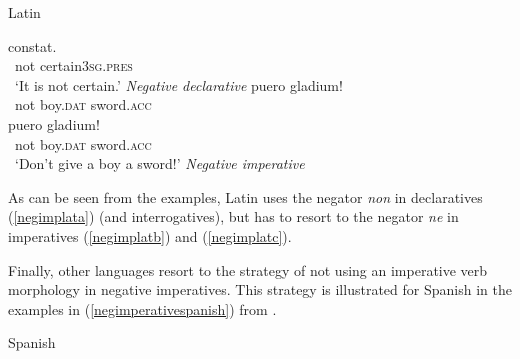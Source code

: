 \begin{exe}
\ex Latin\label{negimplat}
\begin{xlist} 
\ex {} {constat.}\\
{\textcolor{white}{*}not} {certain\textsc{3sg.pres}} \\
\trans \textcolor{white}{*}`It is not certain.' \hfill{\textit{Negative declarative}} \label{negimplata}
\ex {} {puero} {gladium!}\\
{\textcolor{white}{*}not} {boy.\textsc{dat}} {sword.\textsc{acc}} \\
\label{negimplatb}
\ex {} {puero} {gladium!}\\
{\textcolor{white}{*}not} {boy.\textsc{dat}} {sword.\textsc{acc}} \\
\trans \textcolor{white}{*}`Don't give a boy a sword!' \hfill{\textit{Negative imperative}}\label{negimplatc} 

\end{xlist}
\end{exe} 

\noindent As can be seen from the examples, Latin uses the negator \textit{non} in declaratives (\ref{negimplata}) (and interrogatives), but has to resort to the negator \textit{ne} in imperatives (\ref{negimplatb}) and (\ref{negimplatc}). 

Finally, other languages resort to the strategy of not using an imperative verb morphology in negative imperatives. This strategy is illustrated for Spanish in the examples in (\ref{negimperativespanish}) from \citet[57--58]{van2007imperatives}.

\newpage
\begin{exe}
\ex Spanish \citep[57--58]{van2007imperatives}\label{negimperativespanish}
\begin{xlist}
\end{xlist}
\end{exe}


